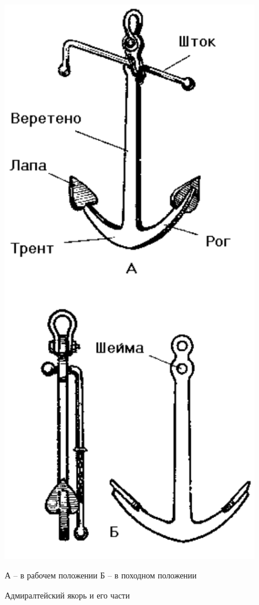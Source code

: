 \documentclass[a4paper, 12pt, twoside, final]{scrbook}
\begin{document}
\begin{figure}
   \centering
   \includegraphics{52_Admiraltejskij_jakor} %
   \caption{Адмиралтейский якорь и его части}
   \label{fig:52}
   \centering \small
   А \--- в рабочем положении Б \--- в походном положении
\end{figure}
\end{document}
